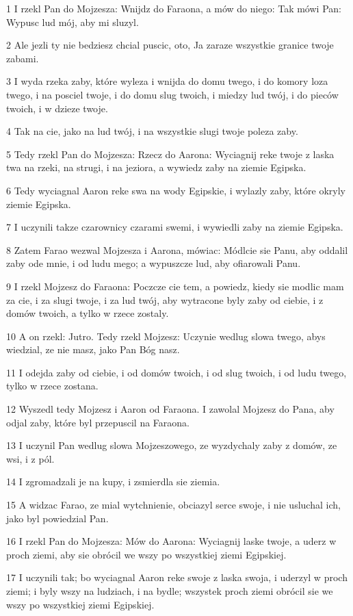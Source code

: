 \par 1 I rzekl Pan do Mojzesza: Wnijdz do Faraona, a mów do niego: Tak mówi Pan: Wypusc lud mój, aby mi sluzyl.
\par 2 Ale jezli ty nie bedziesz chcial puscic, oto, Ja zaraze wszystkie granice twoje zabami.
\par 3 I wyda rzeka zaby, które wyleza i wnijda do domu twego, i do komory loza twego, i na posciel twoje, i do domu slug twoich, i miedzy lud twój, i do pieców twoich, i w dzieze twoje.
\par 4 Tak na cie, jako na lud twój, i na wszystkie slugi twoje poleza zaby.
\par 5 Tedy rzekl Pan do Mojzesza: Rzecz do Aarona: Wyciagnij reke twoje z laska twa na rzeki, na strugi, i na jeziora, a wywiedz zaby na ziemie Egipska.
\par 6 Tedy wyciagnal Aaron reke swa na wody Egipskie, i wylazly zaby, które okryly ziemie Egipska.
\par 7 I uczynili takze czarownicy czarami swemi, i wywiedli zaby na ziemie Egipska.
\par 8 Zatem Farao wezwal Mojzesza i Aarona, mówiac: Módlcie sie Panu, aby oddalil zaby ode mnie, i od ludu mego; a wypuszcze lud, aby ofiarowali Panu.
\par 9 I rzekl Mojzesz do Faraona: Poczcze cie tem, a powiedz, kiedy sie modlic mam za cie, i za slugi twoje, i za lud twój, aby wytracone byly zaby od ciebie, i z domów twoich, a tylko w rzece zostaly.
\par 10 A on rzekl: Jutro. Tedy rzekl Mojzesz: Uczynie wedlug slowa twego, abys wiedzial, ze nie masz, jako Pan Bóg nasz.
\par 11 I odejda zaby od ciebie, i od domów twoich, i od slug twoich, i od ludu twego, tylko w rzece zostana.
\par 12 Wyszedl tedy Mojzesz i Aaron od Faraona. I zawolal Mojzesz do Pana, aby odjal zaby, które byl przepuscil na Faraona.
\par 13 I uczynil Pan wedlug slowa Mojzeszowego, ze wyzdychaly zaby z domów, ze wsi, i z pól.
\par 14 I zgromadzali je na kupy, i zsmierdla sie ziemia.
\par 15 A widzac Farao, ze mial wytchnienie, obciazyl serce swoje, i nie usluchal ich, jako byl powiedzial Pan.
\par 16 I rzekl Pan do Mojzesza: Mów do Aarona: Wyciagnij laske twoje, a uderz w proch ziemi, aby sie obrócil we wszy po wszystkiej ziemi Egipskiej.
\par 17 I uczynili tak; bo wyciagnal Aaron reke swoje z laska swoja, i uderzyl w proch ziemi; i byly wszy na ludziach, i na bydle; wszystek proch ziemi obrócil sie we wszy po wszystkiej ziemi Egipskiej.
